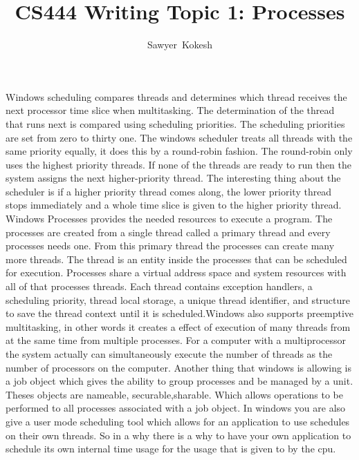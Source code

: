 \documentclass[letterpaper,10pt,draftclsnofoot,onecolumn,titlepage]{IEEEtran}
\begin{document}
	\title{CS444 Writing Topic 1: Processes}
	\author{Sawyer~Kokesh}
	\maketitle
Windows scheduling compares threads and determines which thread receives the next processor time slice when multitasking. The determination of the thread that runs next is compared using scheduling priorities. The scheduling priorities are set from zero to thirty one. The windows scheduler treats all threads with the same priority equally, it does this by a round-robin fashion. The round-robin only uses the highest priority threads. If none of the threads are ready to run then the system assigns the next higher-priority thread. The interesting thing about the scheduler is if a higher priority thread comes along, the lower priority thread stops immediately and a whole time slice is given to the higher priority thread. Windows Processes provides the needed resources to execute a program. The processes are created from a single thread called a primary thread and every processes needs one. From this primary thread the processes can create many more threads. The thread is an entity inside the processes that can be scheduled for execution. Processes share a virtual address space and system resources with all of that processes threads. Each thread contains exception handlers, a scheduling priority, thread local storage, a unique thread identifier, and structure to save the thread context until it is scheduled.Windows also supports preemptive multitasking, in other words it creates a effect of execution of many threads from at the same time from multiple processes. For a computer with a multiprocessor the system actually can simultaneously execute the number of threads as the number of processors on the computer. Another thing that windows is allowing is a job object which gives the ability to group processes and be managed by a unit. Theses objects are nameable, securable,sharable. Which allows operations to be performed to all processes associated with a job object. In windows you are also give a user mode scheduling tool which allows for an application to use schedules on their own threads. So in a why there is a why to have your own application to schedule its own internal time usage for the usage that is given to by the cpu.
\end{document}
